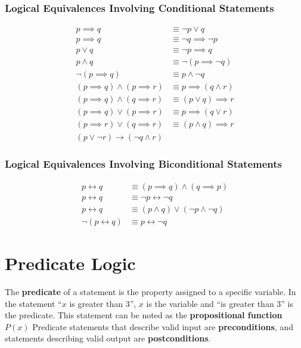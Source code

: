 \subsubsection{Logical Equivalences Involving Conditional Statements}
\begin{align*}
p \implies q &\equiv \neg p \vee q \\
p \implies q &\equiv \neg q \implies \neg p\\
p \vee q &\equiv \neg p \implies q \\
p \wedge q &\equiv \neg(p \implies \neg q) \\
\neg(p \implies q) &\equiv p \wedge \neg q\\
(p \implies q) \wedge(p \implies r) &\equiv p \implies(q \wedge r) \\
(p \implies q) \wedge(q \implies r) &\equiv(p \vee q) \implies r \\
(p \implies q) \vee(p \implies r) &\equiv p \implies(q \vee r) \\
(p \implies r) \vee(q \implies r) &\equiv(p \wedge q) \implies r \\
(p \lor \neg r )\to (\neg q \land r)
\end{align*}

\subsubsection{Logical Equivalences Involving Biconditional Statements}
\begin{align*}
p \leftrightarrow q &\equiv(p \implies q) \wedge(q \implies p) \\ p \leftrightarrow q &\equiv \neg p \leftrightarrow \neg q \\ p \leftrightarrow q &\equiv(p \wedge q) \vee(\neg p \wedge \neg q) \\ \neg(p \leftrightarrow q) &\equiv p \leftrightarrow \neg q
\end{align*}

\section{Predicate Logic}
The \textbf{predicate} of a statement is the property assigned to a specific variable. In the statement ``\(x\) is greater than 3'', \(x\) is the variable and ``is greater than 3'' is the predicate. This statement can be noted as the \textbf{propositional function} \(P(x)\)
Predicate statements that describe valid input are \textbf{preconditions}, and statements describing valid output are \textbf{postconditions}.

